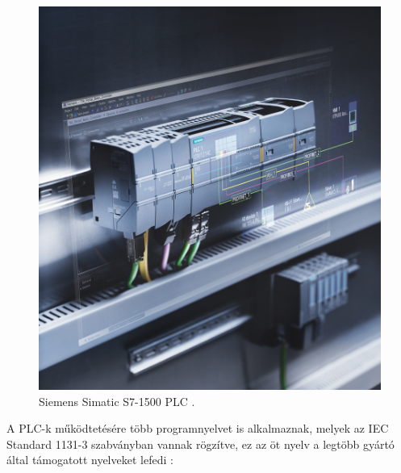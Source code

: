 \begin{figure}
	\centering
	\includegraphics[width=\columnwidth*5/10]{figures/siemens_plc.jpeg}
	\caption{Siemens Simatic S7-1500 PLC \cite{siemens_plc}.}
	\label{plckep}
\end{figure}
A PLC-k működtetésére több programnyelvet is alkalmaznak, melyek az IEC Standard 1131-3 szabványban vannak rögzítve, ez az öt nyelv a legtöbb gyártó által támogatott nyelveket lefedi \cite{Baresi1998}: 
